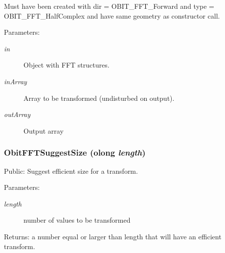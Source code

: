 Must have been created with dir = OBIT\_\-FFT\_\-Forward and type = OBIT\_\-FFT\_\-Half\-Complex and have same geometry as constructor call. \begin{Desc}
\item[Parameters:]
\begin{description}
\item[{\em in}]Object with FFT structures. \item[{\em in\-Array}]Array to be transformed (undisturbed on output). \item[{\em out\-Array}]Output array \end{description}
\end{Desc}
\subsubsection{ Obit\-FFTSuggest\-Size ({\bf olong} {\em length})}\label{ObitFFT_8h_a14}


Public: Suggest efficient size for a transform. 

\begin{Desc}
\item[Parameters:]
\begin{description}
\item[{\em length}]number of values to be transformed \end{description}
\end{Desc}
\begin{Desc}
\item[Returns:]a number equal or larger than length that will have an efficient transform. \end{Desc}

